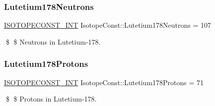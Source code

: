 \subsubsection{\texorpdfstring{Lutetium178\+Neutrons}{Lutetium178Neutrons}}
{\footnotesize\ttfamily \mbox{\hyperlink{group___isotope_const-_macros_ga5f18360b3e99483a35c32d789e62621c}{I\+S\+O\+T\+O\+P\+E\+C\+O\+N\+S\+T\+\_\+\+I\+NT}} Isotope\+Const\+::\+Lutetium178\+Neutrons = 107}

\$ \$ Neutrons in Lutetium-\/178. \mbox{\label{group___isotope_const-_lutetium-_lu178_ga4bbc05bcae28705e982bfe71bfeaea82}} 
\subsubsection{\texorpdfstring{Lutetium178\+Protons}{Lutetium178Protons}}
{\footnotesize\ttfamily \mbox{\hyperlink{group___isotope_const-_macros_ga5f18360b3e99483a35c32d789e62621c}{I\+S\+O\+T\+O\+P\+E\+C\+O\+N\+S\+T\+\_\+\+I\+NT}} Isotope\+Const\+::\+Lutetium178\+Protons = 71}

\$ \$ Protons in Lutetium-\/178. 